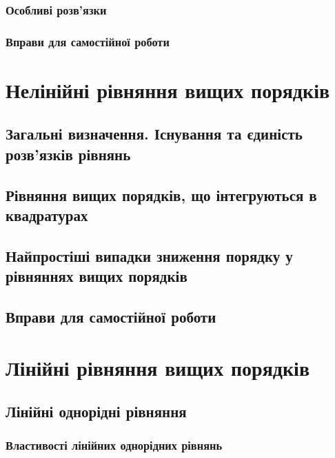 		\subsubsection{Особливі розв'язки}
		

		\subsubsection{Вправи для самостійної роботи}
		

\section{Нелінійні рівняння вищих порядків}


	\subsection{Загальні визначення. Існування та єдиність роз\-в'я\-з\-ків рівнянь}
	

	\subsection{Рівняння вищих порядків, що інтегруються в квадратурах}
	

	\subsection{Найпростіші випадки зниження порядку у рівняннях вищих порядків}
	

	\subsection{Вправи для самостійної роботи}
	

\section{Лі\-ній\-ні рів\-ня\-н\-ня ви\-щих \allowbreak по\-ряд\-ків}


	\subsection{Лінійні однорідні рівняння}
	

		\subsubsection{Властивості лінійних однорідних рівнянь}
		

